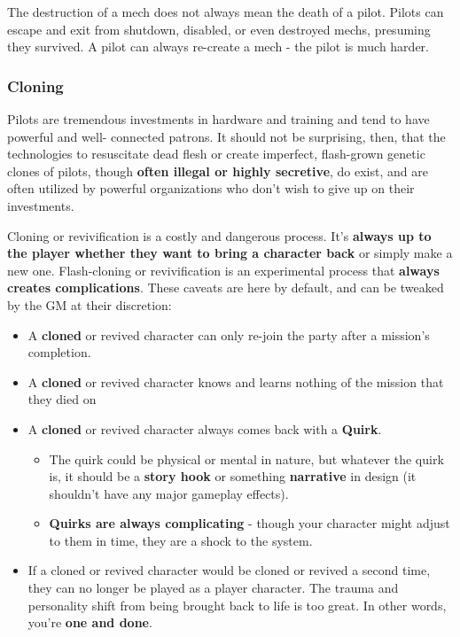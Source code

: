 The destruction of a mech does not always mean the death of a pilot. Pilots can escape and exit from shutdown, disabled, or even destroyed mechs, presuming they survived. A pilot can always re-create a mech - the pilot is much harder.

\subsubsection{Cloning}

Pilots are tremendous investments in hardware and training and tend to have powerful and well- connected patrons. It should not be surprising, then, that the technologies to resuscitate dead flesh or create imperfect, flash-grown genetic clones of pilots, though \textbf{often illegal or highly secretive}, do exist, and are often utilized by powerful organizations who don’t wish to give up on their investments. 

Cloning or revivification is a costly and dangerous process. It’s \textbf{always up to the player whether they want to bring a character back} or simply make a new one. Flash-cloning or revivification is an experimental process that \textbf{always creates complications}. These caveats are here by default, and can be tweaked by the GM at their discretion: 
\begin{itemize}
\item A \textbf{cloned} or revived character can only re-join the party after a mission’s completion. 
\item A \textbf{cloned} or revived character knows and learns nothing of the mission that they died on 
\item A \textbf{cloned} or revived character always comes back with a \textbf{Quirk}. 
\begin{itemize}
\item The quirk could be physical or mental in nature, but whatever the quirk is, it should be a \textbf{story hook} or something \textbf{narrative} in design (it shouldn’t have any major gameplay effects). 
\item \textbf{Quirks are always complicating} - though your character might adjust to them in time, they are a shock to the system.
\end{itemize}
\item If a cloned or revived character would be cloned or revived a second time, they can no longer be played as a player character. The trauma and personality shift from being brought back to life is too great. In other words, you’re \textbf{one and done}.
\end{itemize}


